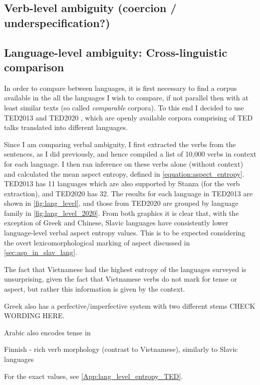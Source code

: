 \subsection{Verb-level ambiguity (coercion / underspecification?)}

\subsection{Language-level ambiguity: Cross-linguistic comparison}

In order to compare between languages, it is first necessary to find a corpus available in the all the languages I wish to compare, if not parallel then with at least similar texts (so called \emph{comparable} corpora). To this end I decided to use TED2013 \citep{tiedemann-2012-parallel} and TED2020 \citep{reimers2020makingmonolingualsentenceembeddings}, which are openly available corpora comprising of TED talks translated into different languages.

Since I am comparing verbal ambiguity, I first extracted the verbs from the sentences, as I did previously, and hence compiled a list of 10,000 verbs in context for each language. I then ran inference on these verbs alone (without context) and calculated the mean aspect entropy, defined in \ref{equation:aspect_entropy}. TED2013 has 11 languages which are also supported by Stanza (for the verb extraction), and TED2020 has 32. The results for each language in TED2013 are shown in \ref{fig:lang_level}, and those from TED2020 are grouped by language family in \ref{fig:lang_level_2020}. From both graphics it is clear that, with the exception of Greek and Chinese, Slavic languages have consistently lower language-level verbal aspect entropy values. This is to be expected considering the overt lexicomorphological marking of aspect discussed in \ref{sec:asp_in_slav_lang}.

The fact that Vietnamese had the highest entropy of the languages surveyed is unsurprising, given the fact that Vietnamese verbs do not mark for tense or aspect, but rather this information is given by the context.

Greek also has a perfective/imperfective system with two different stems CHECK WORDING HERE.

Arabic also encodes tense in 

Finnish - rich verb morphology (contrast to Vietnamese), similarly to Slavic languages

For the exact values, see \ref{App:lang_level_entropy_TED}.

